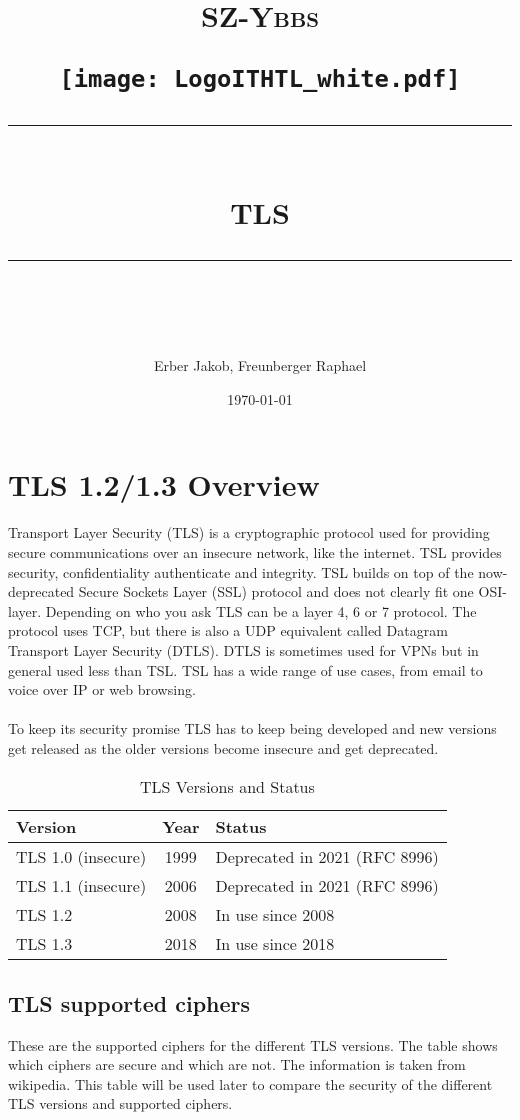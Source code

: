 \documentclass[11pt]{scrartcl} %
\title{	
	\normalfont\normalsize
	\begin{center}
		\begin{minipage}[c]{0.2\textwidth}
			\textsc{\Large SZ-Ybbs}
		\end{minipage}%
		\begin{minipage}[c]{0.1\textwidth}
			\texttt{[image: LogoITHTL\_white.pdf]}
		\end{minipage}
	\end{center}
	\vspace{10pt} %
	\rule{\linewidth}{0.5pt}\\ %
	\vspace{20pt} %
	{\huge TLS}\\ %
	\vspace{12pt} %
	\rule{\linewidth}{2pt}\\ %
	\vspace{12pt} %
}
\author{\LARGE Erber Jakob, Freunberger Raphael} %
\date{\normalsize\today} %
\begin{document}
\maketitle %

\section{TLS 1.2/1.3 Overview}

Transport Layer Security (TLS) is a cryptographic protocol used for providing secure communications over an insecure network, like the internet. TSL provides security, confidentiality authenticate and integrity. TSL builds on top of the now-deprecated Secure Sockets Layer (SSL) protocol and does not clearly fit one OSI-layer. Depending on who you ask TLS can be a layer 4, 6 or 7 protocol. The protocol uses TCP, but there is also a UDP equivalent called Datagram Transport Layer Security (DTLS). DTLS is sometimes used for VPNs but in general used less than TSL. TSL has a wide range of use cases, from email to voice over IP or web browsing.
\\\\
To keep its security promise TLS has to keep being developed and new versions get released as the older versions become insecure and get deprecated.

\begin{table}[h]
    \centering
    \begin{tabular}{|l|c|l|}
        \hline
        \textbf{Version} & \textbf{Year} & \textbf{Status} \\ \hline
        TLS 1.0 (insecure) & 1999 & Deprecated in 2021 (RFC 8996) \\ \hline
        TLS 1.1 (insecure) & 2006 & Deprecated in 2021 (RFC 8996) \\ \hline
        TLS 1.2 & 2008 & In use since 2008 \\ \hline
        TLS 1.3 & 2018 & In use since 2018 \\ \hline
    \end{tabular}
    \caption{TLS Versions and Status}
    \label{tab:tls_versions}
\end{table}

\subsection{TLS supported ciphers}
\label{sec:tls_supported_ciphers}

These are the supported ciphers for the different TLS versions. The table shows which ciphers are secure and which are not. The information is taken from wikipedia. This table will be used later to compare the security of the different TLS versions and supported ciphers.
\end{document}
